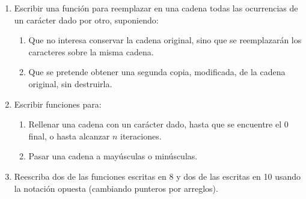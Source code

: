 \begin{enumerate}
	\item Escribir una función para reemplazar en una cadena todas las ocurrencias de
un carácter dado por otro, suponiendo:
	\begin{enumerate}[label=\alph*.]
\item Que no interesa conservar la cadena original, sino que se reemplazarán
      los caracteres sobre la misma cadena.
\item Que se pretende obtener una segunda copia, modificada, de la cadena
      original, sin destruirla.
	\end{enumerate}

	\item Escribir funciones para:
	\begin{enumerate}[label=\alph*.]
\item Rellenar una cadena con un carácter dado, hasta que se encuentre el $0$
      final, o hasta alcanzar $n$ iteraciones.
\item Pasar una cadena a mayúsculas o minúsculas.
	\end{enumerate}

	\item Reescriba dos de las funciones escritas en 8 y dos de las escritas en 10
usando la notación opuesta (cambiando punteros por arreglos).

\end{enumerate}
